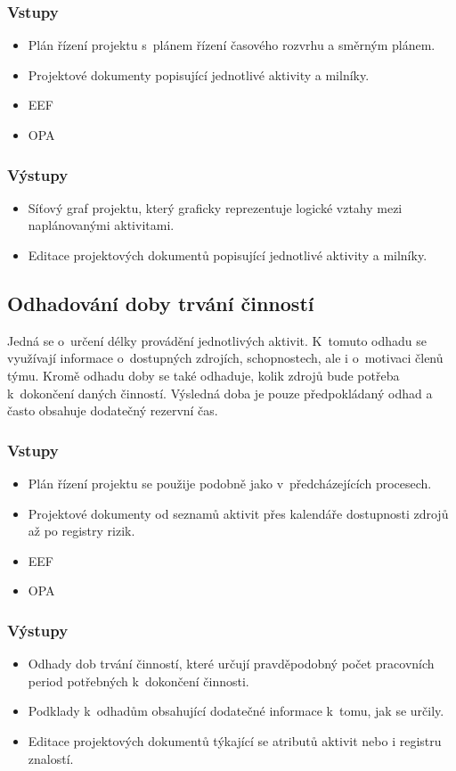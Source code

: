 \subsubsection*{Vstupy}
\begin{itemize}
    \item Plán řízení projektu s~plánem řízení časového rozvrhu a směrným plánem.
    \item Projektové dokumenty popisující jednotlivé aktivity a milníky. 
    \item EEF
    \item OPA
\end{itemize}
\subsubsection*{Výstupy}
\begin{itemize}
    \item Síťový graf projektu, který graficky reprezentuje logické vztahy mezi naplánovanými aktivitami. 
    \item Editace projektových dokumentů popisující jednotlivé aktivity a milníky.
\end{itemize}

\subsection*{Odhadování doby trvání činností}

Jedná se o~určení délky provádění jednotlivých aktivit. K~tomuto odhadu se využívají informace o~dostupných zdrojích, schopnostech, ale i o~motivaci členů týmu. Kromě odhadu doby se také odhaduje, kolik zdrojů bude potřeba k~dokončení daných činností. Výsledná doba je pouze předpokládaný odhad a často obsahuje dodatečný rezervní čas.  

\subsubsection*{Vstupy}
\begin{itemize}
    \item Plán řízení projektu se použije podobně jako v~předcházejících procesech.
    \item Projektové dokumenty od seznamů aktivit přes kalendáře dostupnosti zdrojů až po registry rizik.
    \item EEF
    \item OPA
\end{itemize}
\subsubsection*{Výstupy}
\begin{itemize}
    \item Odhady dob trvání činností, které určují pravděpodobný počet pracovních period potřebných k~dokončení činnosti. 
    \item Podklady k~odhadům obsahující dodatečné informace k~tomu, jak se určily.
    \item Editace projektových dokumentů týkající se atributů aktivit nebo i registru znalostí.
\end{itemize}


